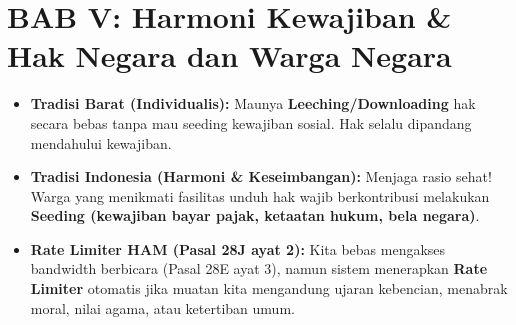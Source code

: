 \documentclass[10pt,a4paper]{article}
\begin{document}
\section*{BAB V: Harmoni Kewajiban \& Hak Negara dan Warga Negara}

\begin{analogibox}
\begin{itemize}
  \item \textbf{Tradisi Barat (Individualis):} Maunya \textbf{Leeching/Downloading} hak secara bebas tanpa mau seeding kewajiban sosial. Hak selalu dipandang mendahului kewajiban.
  \item \textbf{Tradisi Indonesia (Harmoni \& Keseimbangan):} Menjaga rasio sehat! Warga yang menikmati fasilitas unduh hak wajib berkontribusi melakukan \textbf{Seeding (kewajiban bayar pajak, ketaatan hukum, bela negara)}.
  \item \textbf{Rate Limiter HAM (Pasal 28J ayat 2):} Kita bebas mengakses bandwidth berbicara (Pasal 28E ayat 3), namun sistem menerapkan \textbf{Rate Limiter} otomatis jika muatan kita mengandung ujaran kebencian, menabrak moral, nilai agama, atau ketertiban umum.
\end{itemize}
\end{analogibox}
\end{document}
